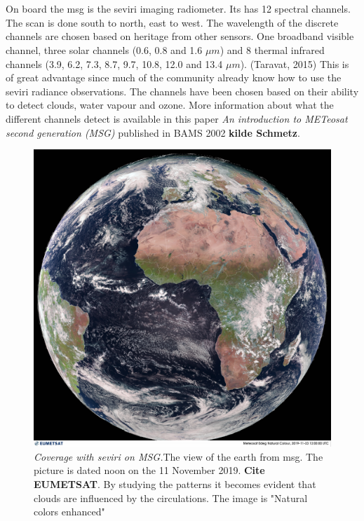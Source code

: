 \\ \\ 
On board the \acrshort{msg} is the \acrfull{seviri} imaging radiometer. Its has  12 spectral channels. The scan is done south to north, east to west. The wavelength of the discrete channels are chosen based on heritage from other sensors. One broadband visible channel, three solar channels (0.6, 0.8 and 1.6 $\mu m$) and 8 thermal infrared channels (3.9, 6.2, 7.3, 8.7, 9.7, 10.8, 12.0 and 13.4 $\mu m$). (Taravat, 2015)  This is of great advantage since much of the community already know how to use the \acrshort{seviri} radiance observations. The channels have been chosen based on their ability to detect clouds, water vapour and ozone. More information about what the different channels detect is available in this paper \textit{An introduction to METeosat second generation (MSG)} published in BAMS 2002 \textbf{kilde Schmetz}. %
\begin{figure}[h]
    \centering
    \includegraphics[scale=0.11]{Chapter2_Theory/images/MET10_RGBNatColourEnhncd_FullResolution_20191123120000.jpg}    
    \caption{\textit{Coverage with \acrshort{seviri} on MSG.}The view of the earth from \acrshort{msg}. The picture is dated noon on the 11 November 2019. \textbf{Cite EUMETSAT}. By studying the patterns it becomes evident that clouds are influenced by the circulations. The image is "Natural colors enhanced"}
    \label{fig:sat_view}
\end{figure}
